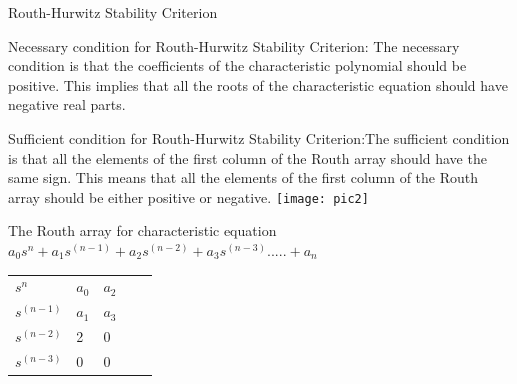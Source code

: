 \documentclass{beamer}
\begin{document}
\begin{frame}{Routh-Hurwitz Stability Criterion}
\begin{block}

Necessary condition for Routh-Hurwitz Stability Criterion: The necessary condition is that the coefficients of the characteristic polynomial should be positive. This implies that all the roots of the characteristic equation should have negative real parts.

Sufficient condition for Routh-Hurwitz Stability Criterion:The sufficient condition is that all the elements of the first column of the Routh array should have the same sign. This means that all the elements of the first column of the Routh array should be either positive or negative.\vspace{16pt}
\texttt{[image: pic2]}
\end{block}

\end{frame}

\begin{frame}
The Routh array for characteristic equation $a_0s^n+a_1s^(n-1)+a_2s^(n-2)+a_3s^(n-3).....+a_n$
\begin{table}[]
\begin{tabular}{lllll}
$s^n$ & $a_0$ & $a_2$ &  &  \\
$s^(n-1)$ & $a_1$ & $a_3$ &  &  \\
$s^(n-2)$ & 2 & 0 &  &  \\
$s^(n-3)$ & 0 & 0 &  & 
\end{tabular}
\end{table}
\end{frame}
\end{document}
